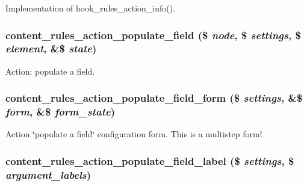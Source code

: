 Implementation of hook\_\-rules\_\-action\_\-info(). \hypertarget{content_8rules_8inc_8bd75d5decd13b84f2ba7756c9a5f520}{
\subsubsection[{content\_\-rules\_\-action\_\-populate\_\-field}]{\setlength{\rightskip}{0pt plus 5cm}content\_\-rules\_\-action\_\-populate\_\-field (\$ {\em node}, \/  \$ {\em settings}, \/  \$ {\em element}, \/  \&\$ {\em state})}}
\label{content_8rules_8inc_8bd75d5decd13b84f2ba7756c9a5f520}


Action: populate a field. \hypertarget{content_8rules_8inc_937a26d1f8114aba412ecb130e95b419}{
\subsubsection[{content\_\-rules\_\-action\_\-populate\_\-field\_\-form}]{\setlength{\rightskip}{0pt plus 5cm}content\_\-rules\_\-action\_\-populate\_\-field\_\-form (\$ {\em settings}, \/  \&\$ {\em form}, \/  \&\$ {\em form\_\-state})}}
\label{content_8rules_8inc_937a26d1f8114aba412ecb130e95b419}


Action \char`\"{}populate a field\char`\"{} configuration form. This is a multistep form! \hypertarget{content_8rules_8inc_26c7f76369ba92878a824253220427de}{
\subsubsection[{content\_\-rules\_\-action\_\-populate\_\-field\_\-label}]{\setlength{\rightskip}{0pt plus 5cm}content\_\-rules\_\-action\_\-populate\_\-field\_\-label (\$ {\em settings}, \/  \$ {\em argument\_\-labels})}}
\label{content_8rules_8inc_26c7f76369ba92878a824253220427de}


